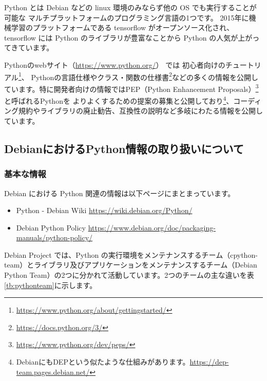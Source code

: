 \documentclass[mingoth,a4paper]{jsarticle}
\begin{document}
Python とは Debian などの linux 環境のみならず他の OS でも実行することが可能な
マルチプラットフォームのプログラミング言語の1つです。
2015年に機械学習のプラットフォームである tensorflow がオープンソース化され、 tensorflow には Python のライブラリが豊富なことから Python の人気が上がってきています。

Pythonのwebサイト（\url{https://www.python.org/}） では
初心者向けのチュートリアル\footnote{\url{https://www.python.org/about/gettingstarted/}}、
Pythonの言語仕様やクラス・関数の仕様書\footnote{\url{https://docs.python.org/3/}}などの多くの情報を公開しています。特に開発者向けの情報ではPEP（Python Enhancement Proposals）\footnote{\url{https://www.python.org/dev/peps/}}と呼ばれるPythonを
よりよくするための提案の募集と公開しており\footnote{DebianにもDEPという似たような仕組みがあります。\url{https://dep-team.pages.debian.net/}}、コーディング規約やライブラリの廃止勧告、互換性の説明など多岐にわたる情報を公開しています。


\subsection{DebianにおけるPython情報の取り扱いについて}

\subsubsection{基本な情報}

Debian における Python 関連の情報は以下ページにまとまっています。

\begin{itemize}
\item Python - Debian Wiki \url{https://wiki.debian.org/Python/}
\item Debian Python Policy \url{https://www.debian.org/doc/packaging-manuals/python-policy/}
\end{itemize}

Debian Project では、Python の実行環境をメンテナンスするチーム（cpython-team）とライブラリ及びアプリケーションをメンテナンスするチーム（Debian Python Team）の2つに分かれて活動しています。2つのチームの主な違いを表\ref{tb:pythonteam}に示します。
\end{document}
